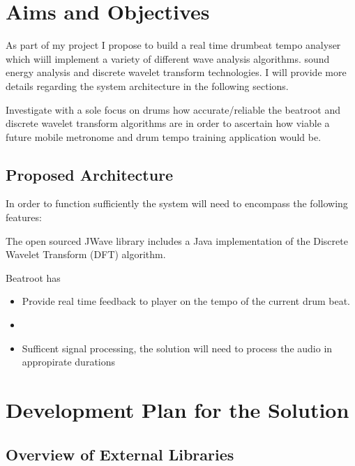 \documentclass[a4paper, 11pt]{article}
\begin{document}
\maketitle{} \section{Aims and Objectives}
As part of my project I propose to build a real time drumbeat tempo analyser which wiill implement a variety of different wave analysis algorithms. sound energy analysis and discrete wavelet transform technologies. I will provide more details regarding the system architecture in the following sections. 

Investigate with a sole focus on drums how accurate/reliable the beatroot and discrete wavelet transform algorithms are in order to ascertain how viable a future mobile metronome and drum tempo training application would be.



\subsection{Proposed Architecture}
In order to function sufficiently the system will need to encompass the following features:

The open sourced JWave library includes a Java implementation of the Discrete Wavelet Transform (DFT) algorithm.

Beatroot has 

\begin{itemize}
\item Provide real time feedback to player on the tempo of the current drum beat.
\item 
\item Sufficent signal processing, the solution will need to process the audio in appropirate durations 
\end{itemize}




\maketitle{} 
\section{Development Plan for the Solution}

\subsection{Overview of External Libraries}
\end{document}
